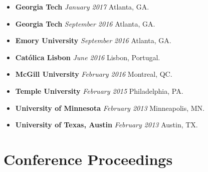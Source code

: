 \documentclass[10.5pt,letterpaper,sans]{moderncv}        %
\begin{document}
\begin{itemize}
\item \textbf{Georgia Tech} \textit{January 2017} Atlanta, GA.
\item \textbf{Georgia Tech} \textit{September 2016} Atlanta, GA.
\item \textbf{Emory University} \textit{September 2016} Atlanta, GA.
\item \textbf{Cat\'olica Lisbon} \textit{June 2016} Lisbon, Portugal.
\item \textbf{McGill University} \textit{February 2016} Montreal, QC.
\item \textbf{Temple University} \textit{February 2015} Philadelphia, PA.
\item \textbf{University of Minnesota} \textit{February 2013} Minneapolis, MN.
\item \textbf{University of Texas, Austin} \textit{February 2013} Austin, TX.

\end{itemize}

\section{Conference Proceedings}
\end{document}
